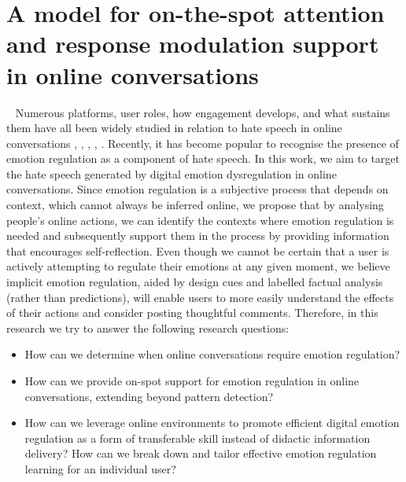 \newpage 
\section{A model for on-the-spot attention and response modulation support in online conversations}~\label{sec:design}
Numerous platforms, user roles, how engagement develops, and what sustains them have all been widely studied in relation to hate speech in online conversations \cite{solovev2022moral}, \cite{saveski2021structure}, \cite{majo2020volume}, \cite{guberman2016quantifying}, \cite{konikoff2021gatekeepers}. Recently, it has become popular to recognise the presence of emotion regulation as a component of hate speech. In this work, we aim to target the hate speech generated by digital emotion dysregulation in online conversations. Since emotion regulation is a subjective process that depends on context, which cannot always be inferred online, we propose that by analysing people's online actions, we can identify the contexts where emotion regulation is needed and subsequently support them in the process by providing information that encourages self-reflection. Even though we cannot be certain that a user is actively attempting to regulate their emotions at any given moment, we believe implicit emotion regulation, aided by design cues and labelled factual analysis (rather than predictions), will enable users to more easily understand the effects of their actions and consider posting thoughtful comments. Therefore, in this research we try to answer the following research questions:
\begin{itemize}
    \item How can we determine when online conversations require emotion regulation?
    \item How can we provide on-spot support for emotion regulation in online conversations, extending beyond pattern detection?
    \item How can we leverage online environments to promote efficient digital emotion regulation as a form of transferable skill instead of didactic information delivery? How can we break down and tailor effective emotion regulation learning for an individual user?
\end{itemize}
